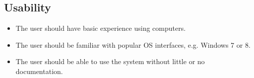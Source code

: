 \subsection*{Usability}
\begin{itemize}
	\item The user should have basic experience using computers.
	\item The user should be familiar with popular OS interfaces, e.g. Windows 7 or 8.
	\item The user should be able to use the system without little or no documentation.
\end{itemize}